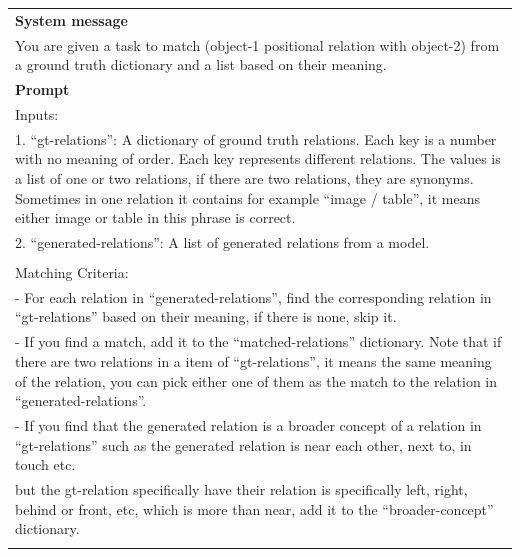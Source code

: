 \begin{table}[h!]\centering
\begin{minipage}{0.95\textwidth}   
\centering
\begin{tcolorbox} 
    \centering
      \small
    \begin{tabular}{p{}}
   { {\bf System message} } \\
You are given a task to match (object-1 positional relation with object-2) from a ground truth dictionary and a list based on their meaning. \\
    \midrule
    {\bf Prompt}  \\
        
       Inputs:\\
        1. ``gt-relations'': A dictionary of ground truth relations. Each key is a number with no meaning of order. Each key represents different relations. The values is a list of one or two relations, 
        if there are two relations, they are synonyms. Sometimes in one relation it contains for example ``image / table'', it means either image or table in this phrase is correct. \\
        2. ``generated-relations'': A list of generated relations from a model. \\\\

        Matching Criteria:\\
        - For each relation in ``generated-relations'', find the corresponding relation in ``gt-relations'' based on their meaning, if there is none, skip it.\\
        - If you find a match, add it to the ``matched-relations'' dictionary. Note that if there are two relations in a item of ``gt-relations'', 
        it means the same meaning of the relation, you can pick either one of them as the match to the relation in ``generated-relations''.\\
        - If you find that the generated relation is a broader concept of a relation in ``gt-relations'' such as the generated relation is near each other, next to, in touch etc. \\
        but the gt-relation specifically have their relation is specifically left, right, behind or front, etc, which is more than near, add it to the ``broader-concept'' dictionary. \\\\
        

\end{tabular}
\end{tcolorbox}
\end{minipage}
\end{table}
